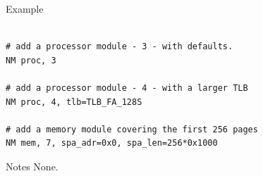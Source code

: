 \begin{iPageDescOpEntry}{Example}
\begin{lstlisting}[style=iPageOpStyle]

# add a processor module - 3 - with defaults.
NM proc, 3

# add a processor module - 4 - with a larger TLB                   
NM proc, 4, tlb=TLB_FA_128S

# add a memory module covering the first 256 pages
NM mem, 7, spa_adr=0x0, spa_len=256*0x1000

\end{lstlisting}
\end{iPageDescOpEntry}

\begin{iPageDescEntry}{Notes}
None.
\end{iPageDescEntry}
